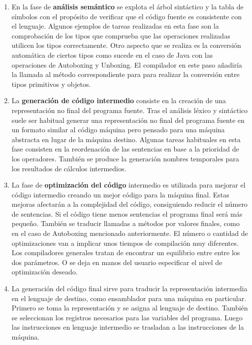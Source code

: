\begin{enumerate}
    \item En la fase de \textbf{análisis semántico} se explota el árbol sintáctico y la tabla de símbolos con el propósito de verificar que el código fuente es consistente con el lenguaje. Algunos ejemplos de tareas realizadas en esta fase son la comprobación de los tipos que comprueba que las operaciones realizadas utilicen los tipos correctamente. Otro aspecto que se realiza es la conversión automática de ciertos tipos como sucede en el caso de Java con las operaciones de Autoboxing y Unboxing. El compilador en este paso añadiría la llamada al método correspondiente para para realizar la conversión entre tipos primitivos y objetos.
    
    \item La \textbf{generación de código intermedio} consiste en la creación de una representación no final del programa fuente. Tras el análisis léxico y sintáctico suele ser habitual generar una representación no final del programa fuente en un formato similar al código máquina pero pensado para una máquina abstracta en lugar de la máquina destino. Algunas tareas habituales en esta fase consisten en la reordenación de las sentencias en base a la prioridad de los operadores. También se produce la generación nombres temporales para los resultados de cálculos intermedios.
    
    \item La fase de \textbf{optimización del código} intermedio es utilizada para mejorar el código intermedio creando un mejor código para la máquina final. Estas mejoras afectarán a la complejidad del código, consiguiendo reducir el número de sentencias. Si el código tiene menos sentencias el programa final será más pequeño. También se traducir llamadas a métodos por valores finales, como en el caso de Autoboxing mencionado anteriormente. El número o cantidad de optimizaciones van a implicar unos tiempos de compilación muy diferentes. Los compiladores generales tratan de encontrar un equilibrio entre entre los dos parámetros. O se deja en manos del usuario especificar el nivel de optimización deseado.
    
    \item La generación del código final sirve para traducir la representación intermedia en el lenguaje de destino, como ensamblador para una máquina en particular. Primero se toma la representación y se asigna al lenguaje de destino. También se seleccionan los registros necesarios para las variables del programa. Luego las instrucciones en lenguaje intermedio se trasladan a las instrucciones de la máquina.

\end{enumerate}

